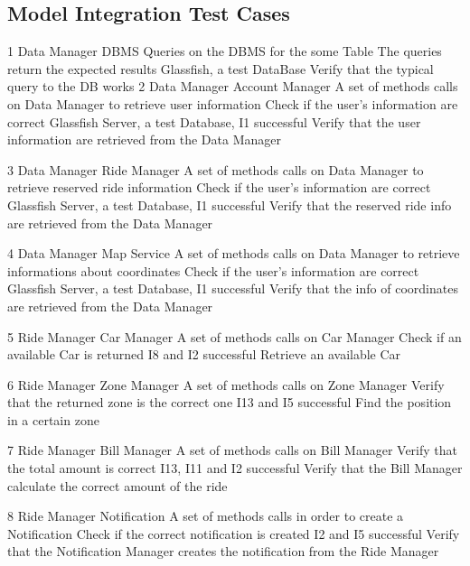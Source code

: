 \subsection{Model Integration Test Cases}
\testCase
	{1}
	{Data Manager}
	{DBMS}
	{Queries on the DBMS for the some Table }
	{The queries return the expected results}
	{Glassfish, a test DataBase}
	{Verify that the typical query to the DB works}
\testCase
	{2}
	{Data Manager}
	{Account Manager}
	{A set of methods calls on Data Manager to retrieve user information}
	{Check if the user's information are correct}
	{Glassfish Server, a test Database, I1 successful}
	{Verify that the user information are retrieved from the Data Manager}

\testCase
	{3}
	{Data Manager}
	{Ride Manager}
	{A set of methods calls on Data Manager to retrieve reserved ride information}
	{Check if the user's information are correct}
	{Glassfish Server, a test Database, I1 successful}
	{Verify that the reserved ride info are retrieved from the Data Manager}
	
\testCase
	{4}
	{Data Manager}
	{Map Service}
	{A set of methods calls on Data Manager to retrieve informations about coordinates}
	{Check if the user's information are correct}
	{Glassfish Server, a test Database, I1 successful}
	{Verify that the info of coordinates are retrieved from the Data Manager}

\testCase
	{5}
	{Ride Manager}
	{Car Manager}
	{A set of methods calls on Car Manager}
	{Check if an available Car is returned}
	{I8 and I2 successful}
	{Retrieve an available Car}

\testCase
	{6}
	{Ride Manager}
	{Zone Manager}
	{A set of methods calls on Zone Manager}
	{Verify that the returned zone is the correct one}
	{I13 and I5 successful}
	{Find the position in a certain zone}

\testCase
	{7}
	{Ride Manager}
	{Bill Manager}
	{A set of methods calls on Bill Manager}
	{Verify that the total amount is correct}
	{I13, I11 and I2 successful}
	{Verify that the Bill Manager calculate the correct amount of the ride}

\testCase
	{8}
	{Ride Manager}
	{Notification}
	{A set of methods calls in order to create a Notification}
	{Check if the correct notification is created}
	{I2 and I5 successful}
	{Verify that the Notification Manager creates the notification from the Ride Manager}
	
